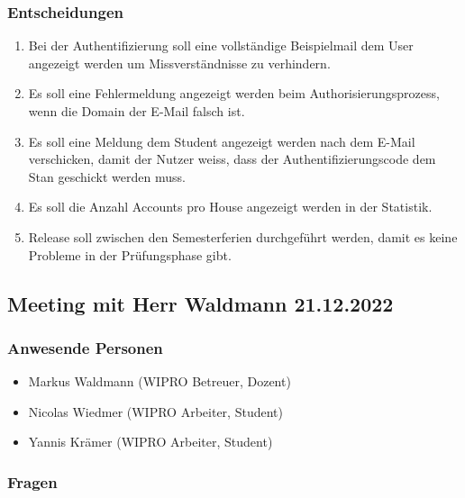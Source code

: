 \documentclass[a4paper, table]{article}
\begin{document}
\subsubsection*{Entscheidungen}

\begin{enumerate}
    \item Bei der Authentifizierung soll eine vollständige Beispielmail dem User angezeigt werden um Missverständnisse zu verhindern.
    \item Es soll eine Fehlermeldung angezeigt werden beim Authorisierungsprozess, wenn die Domain der E-Mail falsch ist.
    \item Es soll eine Meldung dem Student angezeigt werden nach dem E-Mail verschicken, damit der Nutzer weiss, dass der Authentifizierungscode dem Stan geschickt werden muss.
    \item Es soll die Anzahl Accounts pro House angezeigt werden in der Statistik.
    \item Release soll zwischen den Semesterferien durchgeführt werden, damit es keine Probleme in der Prüfungsphase gibt.
\end{enumerate}

\newpage
\subsection{Meeting mit Herr Waldmann 21.12.2022}


\subsubsection*{Anwesende Personen}

\begin{itemize}
    \item Markus Waldmann (WIPRO Betreuer, Dozent)
    \item Nicolas Wiedmer (WIPRO Arbeiter, Student)
    \item Yannis Krämer (WIPRO Arbeiter, Student)
\end{itemize}

\subsubsection*{Fragen}
\end{document}
